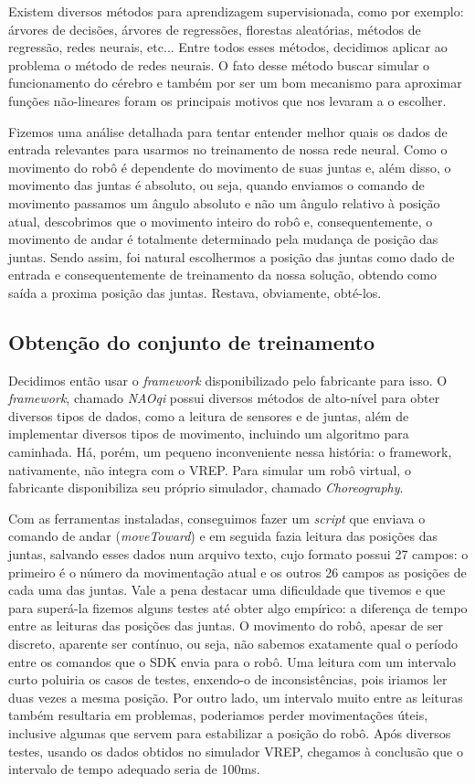 \documentclass[twoside,conference,a4paper]{IEEEtran}
\begin{document}
Existem diversos métodos para aprendizagem supervisionada, como por exemplo: árvores de decisões, árvores de regressões, florestas aleatórias, métodos de regressão, redes neurais, etc... Entre todos esses métodos, decidimos aplicar ao problema o método de redes neurais. O fato desse método buscar simular o funcionamento do cérebro e também por ser um bom mecanismo para aproximar funções não-lineares foram os principais motivos que nos levaram a o escolher.

Fizemos uma análise detalhada para tentar entender melhor quais os dados de entrada relevantes para usarmos no treinamento de nossa rede neural. Como o movimento do robô é dependente do movimento de suas juntas e, além disso, o movimento das juntas é absoluto, ou seja, quando enviamos o comando de movimento passamos um ângulo absoluto e não um ângulo relativo à posição atual, descobrimos que o movimento inteiro do robô e, consequentemente, o movimento de andar é totalmente determinado pela mudança de posição das juntas. Sendo assim, foi natural escolhermos a posição das juntas como dado de entrada e consequentemente de treinamento da nossa solução, obtendo como saída a proxima posição das juntas. Restava, obviamente, obté-los.  

\subsection{Obtenção do conjunto de treinamento}

Decidimos então usar o \textsl{framework} disponibilizado pelo fabricante para isso. O \textsl{framework}, chamado \textsl{NAOqi}\cite{naoqi} possui diversos métodos de alto-nível para obter diversos tipos de dados, como a leitura de sensores e de juntas, além de implementar diversos tipos de movimento, incluindo um algoritmo para caminhada. Há, porém, um pequeno inconveniente nessa história: o framework, nativamente, não integra com o VREP. Para simular um robô virtual, o fabricante disponibiliza seu próprio simulador, chamado \textsl{Choreography}. 

Com as ferramentas instaladas, conseguimos fazer um \textsl{script} que enviava o comando de andar (\textsl{moveToward}) e em seguida fazia leitura das posições das juntas, salvando esses dados num arquivo texto, cujo formato possui 27 campos: o primeiro é o número da movimentação atual e os outros 26 campos as posições de cada uma das juntas. Vale a pena destacar uma dificuldade que tivemos e que para superá-la fizemos alguns testes até obter algo empírico: a diferença de tempo entre as leituras das posições das juntas. O movimento do robô, apesar de ser discreto, aparente ser contínuo, ou seja, não sabemos exatamente qual o período entre os comandos que o SDK envia para o robô. Uma leitura com um intervalo curto poluiria os casos de testes, enxendo-o de inconsistências, pois iriamos ler duas vezes a mesma posição. Por outro lado, um intervalo muito entre as leituras também resultaria em problemas, poderiamos perder movimentações úteis, inclusive algumas que servem para estabilizar a posição do robô. Após diversos testes, usando os dados obtidos no simulador VREP, chegamos à conclusão que o intervalo de tempo adequado seria de 100ms. 
\end{document}
